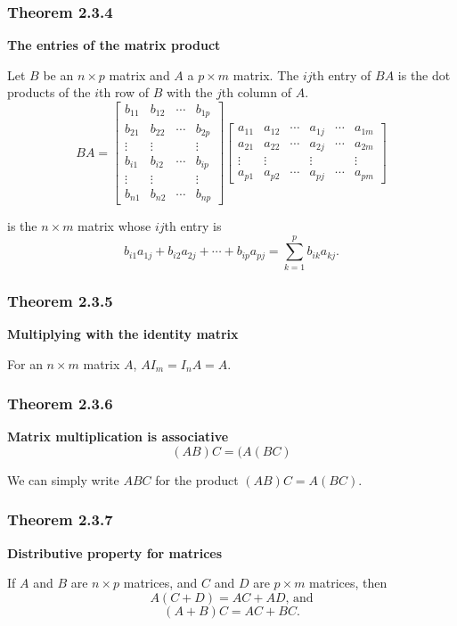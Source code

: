 \documentclass{report}
\begin{document}
\subsubsection*{Theorem 2.3.4}
\par\noindent\textbf{The entries of the matrix product}
\par\noindent Let $B$ be an $n\times{}p$ matrix and $A$ a $p\times{}m$ matrix. The $ij$th entry of $BA$ is the dot products of the $i$th row of $B$ with the $j$th column of $A$.
\[BA=\left[\begin{array}{cccc}b_{11}&b_{12}&\cdots{}&b_{1p}\\ b_{21}&b_{22}&\cdots{}&b_{2p}\\ \vdots{}&\vdots{}&&\vdots{}\\ b_{i1}&b_{i2}&\cdots{}&b_{ip}\\ \vdots{}&\vdots{}&&\vdots{}\\ b_{n1}&b_{n2}&\cdots{}&b_{np}\end{array}\right]\left[\begin{array}{cccccc}a_{11}&a_{12}&\cdots{}&a_{1j}&\cdots{}&a_{1m}\\ a_{21}&a_{22}&\cdots{}&a_{2j}&\cdots{}&a_{2m}\\ \vdots{}&\vdots{}&&\vdots{}&&\vdots{}\\ a_{p1}&a_{p2}&\cdots{}&a_{pj}&\cdots{}&a_{pm}\end{array}\right]\]
\par\noindent is the $n\times{}m$ matrix whose $ij$th entry is
\[b_{i1}a_{1j}+b_{i2}a_{2j}+\cdots{}+b_{ip}a_{pj}=\sum_{k=1}^{p}b_{ik}a_{kj}.\]
\subsubsection*{Theorem 2.3.5}
\par\noindent\textbf{Multiplying with the identity matrix}
\par\noindent For an $n\times{}m$ matrix $A$, $AI_{m}=I_{n}A=A$.
\subsubsection*{Theorem 2.3.6}
\par\noindent\textbf{Matrix multiplication is associative}
\[(AB)C=(A(BC)\]
\par\noindent We can simply write $ABC$ for the product $(AB)C=A(BC)$.
\subsubsection*{Theorem 2.3.7}
\par\noindent\textbf{Distributive property for matrices}
\par\noindent If $A$ and $B$ are $n\times{}p$ matrices, and $C$ and $D$ are $p\times{}m$ matrices, then 
\[A(C+D)=AC+AD\textrm{, and}\]
\[(A+B)C=AC+BC.\]
\end{document}

